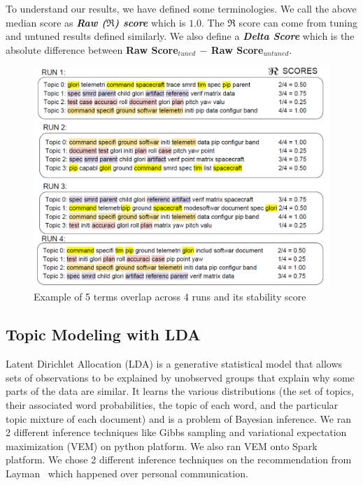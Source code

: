 \documentclass[10pt,conference]{IEEEtran}
\theoremstyle{break}
\begin{document}
To understand our results, we have defined some terminologies. We call the above median score as \textbf{\textit{Raw ($\Re$) score}} which is $1.0$. The \textbf{$\Re$} score can come from tuning and untuned results defined similarly. We also define a \textbf{\textit{Delta Score}} which is the absolute difference between \textbf{Raw Score$_{tuned}$ $-$ Raw Score$_{untuned}$}.

\begin{figure}[!htbp]
  \captionsetup{justification=centering}
  \includegraphics[width=\linewidth]{./fig/jaccard.png}
  \caption{Example of 5 terms overlap across 4 runs and its stability score}
  \label{fig: jaccard}
\end{figure}

\subsection{Topic Modeling with LDA}
\label{sect: LDA}
Latent Dirichlet Allocation (LDA) is a generative statistical model that allows sets of observations to be explained by unobserved groups that explain why some parts of the data are similar. It learns the various distributions (the set of topics, their associated word probabilities, the topic of each word, and the particular topic mixture of each document) and is a problem of Bayesian inference. We ran 2 different inference techniques like Gibbs sampling and variational expectation maximization (VEM) on python platform. We also ran VEM onto Spark platform. We chose 2 different inference techniques on the recommendation from Layman~\cite{layman16a, layman2016topic} which happened over personal communication.
\end{document}
